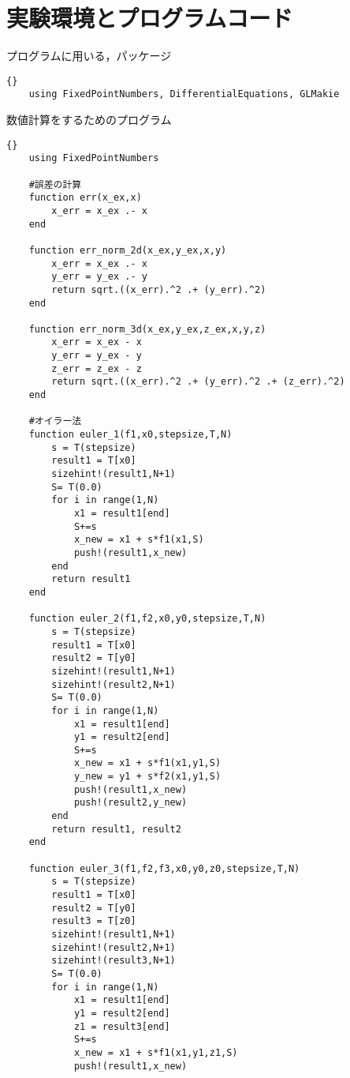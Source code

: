 \chapter{実験環境とプログラムコード}
プログラムに用いる，パッケージ
\begin{lstlisting}[caption=package,label=1]{}
    using FixedPointNumbers, DifferentialEquations, GLMakie
\end{lstlisting}


数値計算をするためのプログラム
\begin{lstlisting}[caption =\text{numerical\_scheme.jl}, label = a]{}
    using FixedPointNumbers

    #誤差の計算
    function err(x_ex,x)
        x_err = x_ex .- x
    end

    function err_norm_2d(x_ex,y_ex,x,y)
        x_err = x_ex .- x
        y_err = y_ex .- y
        return sqrt.((x_err).^2 .+ (y_err).^2)
    end

    function err_norm_3d(x_ex,y_ex,z_ex,x,y,z)
        x_err = x_ex - x
        y_err = y_ex - y
        z_err = z_ex - z
        return sqrt.((x_err).^2 .+ (y_err).^2 .+ (z_err).^2)
    end

    #オイラー法
    function euler_1(f1,x0,stepsize,T,N) 
        s = T(stepsize)
        result1 = T[x0]
        sizehint!(result1,N+1)
        S= T(0.0)
        for i in range(1,N)
            x1 = result1[end]
            S+=s
            x_new = x1 + s*f1(x1,S)
            push!(result1,x_new)
        end
        return result1
    end

    function euler_2(f1,f2,x0,y0,stepsize,T,N)
        s = T(stepsize)
        result1 = T[x0]
        result2 = T[y0]
        sizehint!(result1,N+1)
        sizehint!(result2,N+1)
        S= T(0.0)
        for i in range(1,N)
            x1 = result1[end]
            y1 = result2[end]
            S+=s
            x_new = x1 + s*f1(x1,y1,S)
            y_new = y1 + s*f2(x1,y1,S)
            push!(result1,x_new)
            push!(result2,y_new)
        end
        return result1, result2
    end

    function euler_3(f1,f2,f3,x0,y0,z0,stepsize,T,N)
        s = T(stepsize)
        result1 = T[x0]
        result2 = T[y0]
        result3 = T[z0]
        sizehint!(result1,N+1)
        sizehint!(result2,N+1)
        sizehint!(result3,N+1)
        S= T(0.0)
        for i in range(1,N)
            x1 = result1[end]
            y1 = result2[end]
            z1 = result3[end]
            S+=s
            x_new = x1 + s*f1(x1,y1,z1,S)
            push!(result1,x_new)


\end{lstlisting}
